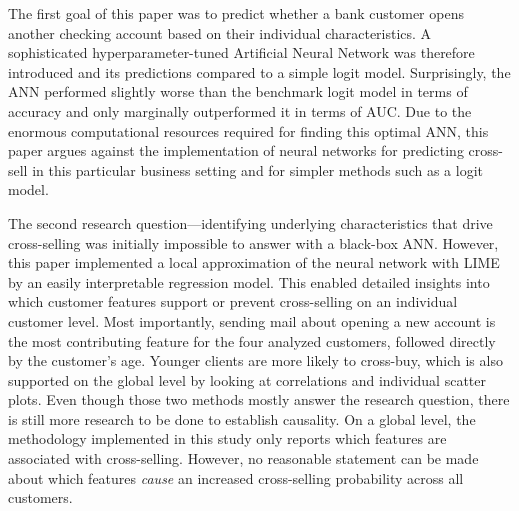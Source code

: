 \documentclass[12pt,a4paper]{article}
\begin{document}
The first goal of this paper was to predict whether a bank customer opens another checking account based on their individual characteristics.
A sophisticated hyper\-parameter\--tuned Artificial Neural Network was therefore introduced and its predictions compared to a simple logit model.
Surprisingly, the ANN performed slightly worse than the benchmark logit model in terms of accuracy and only marginally outperformed it in terms of AUC.
Due to the enormous computational resources required for finding this optimal ANN, this paper argues against the implementation of neural networks
for predicting cross-sell in this particular business setting and for simpler methods such as a logit model.

The second research question---identifying underlying characteristics that drive cross-selling was initially impossible to answer with a black-box ANN.
However, this paper implemented a local approximation of the neural network with LIME by an easily interpretable regression model.
This enabled detailed insights into which customer features support or prevent cross-selling on an individual customer level.
Most importantly, sending mail about opening a new account is the most contributing feature for the four analyzed customers, followed directly by the customer's age.
Younger clients are more likely to cross-buy, which is also supported on the global level by looking at correlations and individual scatter plots.
Even though those two methods mostly answer the research question, there is still more research to be done to establish causality.
On a global level, the methodology implemented in this study only reports which features are associated with cross-selling.
However, no reasonable statement can be made about which features \textit{cause} an increased cross-selling probability across all customers.




\clearpage
\appendix
\end{document}
